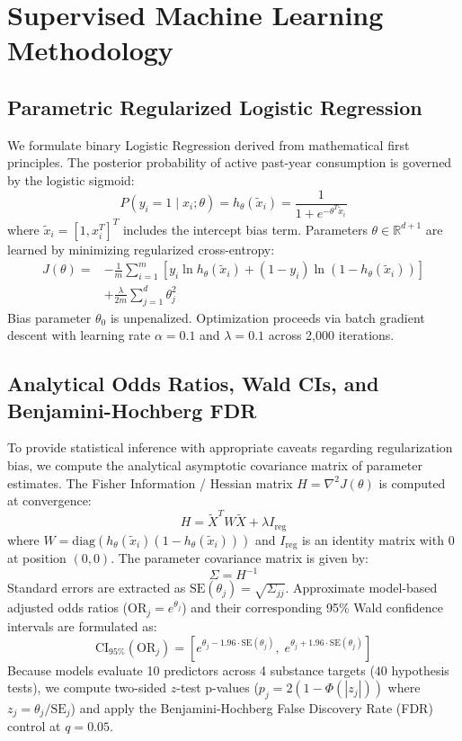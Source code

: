 \documentclass[conference]{IEEEtran}
\begin{document}
\section{Supervised Machine Learning Methodology}

\subsection{Parametric Regularized Logistic Regression}
We formulate binary Logistic Regression derived from mathematical first principles. The posterior probability of active past-year consumption is governed by the logistic sigmoid:
\begin{equation}
P(y_i = 1 \mid x_i; \theta) = h_\theta(\tilde{x}_i) = \frac{1}{1 + e^{-\theta^T \tilde{x}_i}}
\end{equation}
where $\tilde{x}_i = [1, x_i^T]^T$ includes the intercept bias term. Parameters $\theta \in \mathbb{R}^{d+1}$ are learned by minimizing regularized cross-entropy:
\begin{align}
J(\theta) = &-\frac{1}{m} \sum_{i=1}^m \left[ y_i \ln h_\theta(\tilde{x}_i) + (1-y_i) \ln(1-h_\theta(\tilde{x}_i)) \right] \nonumber \\
&+ \frac{\lambda}{2m} \sum_{j=1}^d \theta_j^2
\end{align}
Bias parameter $\theta_0$ is unpenalized. Optimization proceeds via batch gradient descent with learning rate $\alpha = 0.1$ and $\lambda = 0.1$ across 2,000 iterations.

\subsection{Analytical Odds Ratios, Wald CIs, and Benjamini-Hochberg FDR}
To provide statistical inference with appropriate caveats regarding regularization bias, we compute the analytical asymptotic covariance matrix of parameter estimates. The Fisher Information / Hessian matrix $H = \nabla^2 J(\theta)$ is computed at convergence:
\begin{equation}
H = \tilde{X}^T W \tilde{X} + \lambda I_{\text{reg}}
\end{equation}
where $W = \text{diag}(h_\theta(\tilde{x}_i)(1 - h_\theta(\tilde{x}_i)))$ and $I_{\text{reg}}$ is an identity matrix with 0 at position $(0, 0)$. The parameter covariance matrix is given by:
\begin{equation}
\Sigma = H^{-1}
\end{equation}
Standard errors are extracted as $\text{SE}(\theta_j) = \sqrt{\Sigma_{jj}}$. Approximate model-based adjusted odds ratios ($\text{OR}_j = e^{\theta_j}$) and their corresponding 95\% Wald confidence intervals are formulated as:
\begin{equation}
\text{CI}_{95\%}(\text{OR}_j) = \left[ e^{\theta_j - 1.96 \cdot \text{SE}(\theta_j)}, \; e^{\theta_j + 1.96 \cdot \text{SE}(\theta_j)} \right]
\end{equation}
Because models evaluate 10 predictors across 4 substance targets ($40$ hypothesis tests), we compute two-sided $z$-test p-values ($p_j = 2(1 - \Phi(|z_j|))$ where $z_j = \theta_j / \text{SE}_j$) and apply the Benjamini-Hochberg False Discovery Rate (FDR) control at $q = 0.05$.
\end{document}
